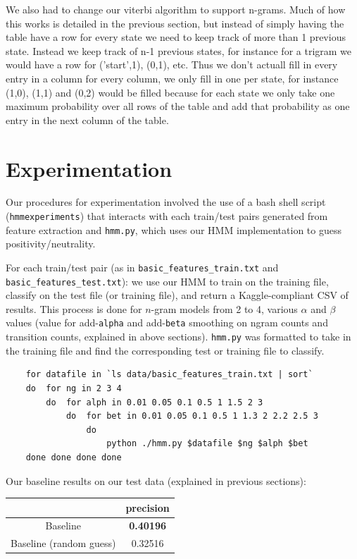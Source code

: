 \documentclass{article}
\begin{document}
We also had to change our viterbi algorithm to support n-grams. Much of how this works is detailed in the previous section, but instead of simply having the table have a row for every state we need to keep track of more than 1 previous state. Instead we keep track of n-1 previous states, for instance for a trigram we would have a row for ('start',1), (0,1), etc. Thus we don't actuall fill in every entry in a column for every column, we only fill in one per state, for instance (1,0), (1,1) and (0,2) would be filled because for each state we only take one maximum probability over all rows of the table and add that probability as one entry in the next column of the table.

\section{Experimentation}

Our procedures for experimentation involved the use of a bash shell script (\texttt{hmmexperiments}) that interacts with each train/test pairs generated from feature extraction and \texttt{hmm.py}, which uses our HMM implementation to guess positivity/neutrality.\par

For each train/test pair (as in \texttt{basic\_features\_train.txt} and \texttt{basic\_features\_test.txt}): we use our HMM to train on the training file, classify on the test file (or training file), and return a Kaggle-compliant CSV of results. This process is done for $n$-gram models from 2 to 4, various $\alpha$ and $\beta$ values (value for add-\texttt{alpha} and add-\texttt{beta} smoothing on ngram counts and transition counts, explained in above sections). \texttt{hmm.py} was formatted to take in the training file and find the corresponding test or training file to classify.\par

\begin{verbatim}
    for datafile in `ls data/basic_features_train.txt | sort`
    do  for ng in 2 3 4
        do  for alph in 0.01 0.05 0.1 0.5 1 1.5 2 3
            do  for bet in 0.01 0.05 0.1 0.5 1 1.3 2 2.2 2.5 3
                do
                    python ./hmm.py $datafile $ng $alph $bet
    done done done done
\end{verbatim}

Our baseline results on our test data (explained in previous sections):\par\medskip
\begin{tabular}{|c|c|}\hline
                        & precision\\\hline
Baseline                & \textbf{0.40196}\\
Baseline (random guess) & 0.32516\\\hline
\end{tabular}\par\medskip
\end{document}
